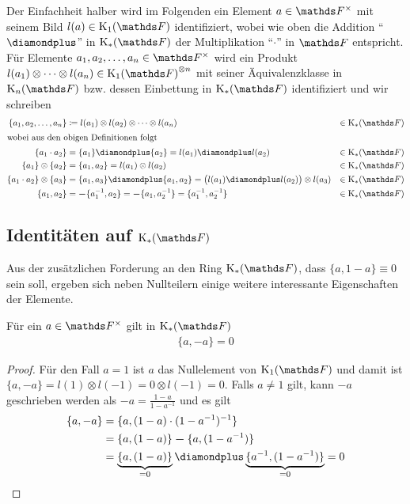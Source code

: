 \documentclass[ngerman,fontsize=11pt, paper=a4, parskip=half, titlepage=true, toc=bib]{scrartcl}
\begin{document}
\begin{Not}
  Der Einfachheit halber wird im Folgenden
  ein Element $a\in\Fx$ mit seinem Bild
  $l(a)\in\K_1(\F)$ identifiziert, wobei wie oben 
  die Addition \enquote{$\p$} in $\KF$
  der Multiplikation \enquote{$\cdot$} in $\F$ entspricht.
  Für Elemente $a_1,a_2,\dotsc,a_n\in\Fx$ wird
  ein Produkt $l(a_1)\otimes\dotsb \otimes l(a_n)\in{\KoF}^{\otimes n}$ 
  mit seiner Äquivalenzklasse in $\KnF$ 
  bzw. dessen Einbettung in $\KF$ identifiziert
  und wir schreiben
  \begin{align*}
    \{ a_1,a_2,\dotsc,a_n\}
    &\coloneqq l(a_1)\otimes l(a_2)\otimes \dotsb \otimes l(a_n) &\in\KF \\
    \intertext{wobei aus den obigen Definitionen folgt}
    \{ a_1 \cdot a_2 \}
    &=  \{a_1\}\p \{a_2\} = l(a_1)\p l(a_2)  &\in\KF \\
    \{ a_1 \} \otimes \{ a_2 \}
    &= \{ a_1,a_2 \} = l(a_1)\otimes l(a_2) &\in\KF \\
    \{ a_1\cdot a_2 \} \otimes \{ a_3 \}
    &= \{ a_1,a_3 \} \p \{a_1, a_2\} 
      =  \big(l(a_1)\p l(a_2)\big) \otimes l(a_3) &\in\KF\\
    \{ a_1, a_2\} 
    &= \m\{a_1^{-1},a_2\} = \m\{a_1,a_2^{-1}\} 
      = \{a_1^{-1},a_2^{-1}\} &\in\KF                                                    
  \end{align*}
\end{Not}

\subsection{Identitäten auf $\KF$}

Aus der zusätzlichen Forderung an den Ring $\KF$, 
dass $\{a,1-a\}\equiv 0$ sein soll, ergeben sich neben Nullteilern 
einige weitere interessante Eigenschaften der Elemente.

\begin{Lem}\label{identitaetminus}
  Für ein $a \in\Fx$ gilt in $\KF$
  \begin{gather*}
    \{a,-a\}=0
  \end{gather*}
  \begin{proof}
    Für den Fall $a=1$ ist $a$ das Nullelement von $\KoF$ und damit ist 
    $\{a,-a\}=l(1)\otimes l(-1) = 0\otimes l(-1) = 0$.
    Falls $a\neq 1$ gilt, kann $-a$ geschrieben werden als
    $-a=\frac{1-a}{1-a^{-1}}$ und es gilt
      \begin{align*}
        \{a,-a\} &= \{a,(1-a)\cdot (1-a^{-1})^{-1}\}\\
                 &= \{a,(1-a)\}\m\{a,(1-a^{-1})\} \\
                 &= \underbrace{\{a,(1-a)\}}_{=0}
                   \p\underbrace{\{a^{-1},(1-a^{-1})\}}_{=0} 
                   =0
      \end{align*}
  \end{proof}
\end{Lem}
\end{document}
